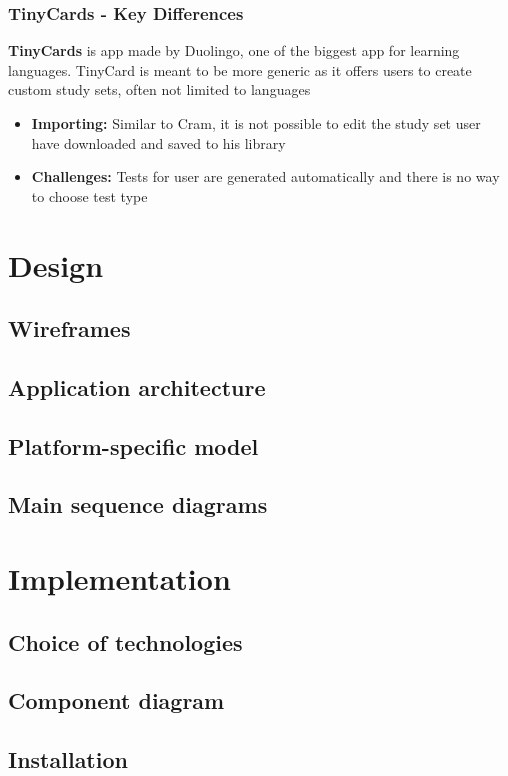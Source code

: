 \documentclass[thesis=B,english]{FITthesis}[2012/10/20]
\begin{document}
\subsection{TinyCards - Key Differences}

\textbf{TinyCards} is app made by Duolingo, one of the biggest app for learning languages. TinyCard is meant to be more generic as it offers users to create custom study sets, often not limited to languages
	\begin{itemize}
		\item \textbf{Importing:} Similar to Cram, it is not possible to edit the study set user have downloaded and saved to his library
		\item \textbf{Challenges:} Tests for user are generated automatically and there is no way to choose test type
	\end{itemize}
	
\newpage

\chapter{Design}
\section{Wireframes}
\section{Application architecture}
\section{Platform-specific model}
\section{Main sequence diagrams}

\chapter{Implementation}
\section{Choice of technologies}
\section{Component diagram}
\section{Installation}
\end{document}
